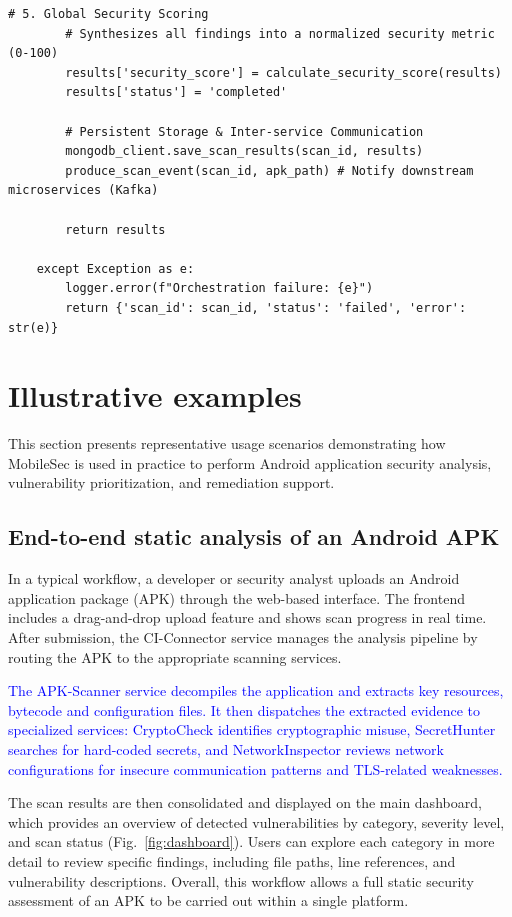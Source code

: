 \documentclass[preprint,12pt, a4paper]{elsarticle}
\begin{document}
\begin{lstlisting}[style=pythonStyle]
        # 5. Global Security Scoring
        # Synthesizes all findings into a normalized security metric (0-100)
        results['security_score'] = calculate_security_score(results)
        results['status'] = 'completed'

        # Persistent Storage & Inter-service Communication
        mongodb_client.save_scan_results(scan_id, results)
        produce_scan_event(scan_id, apk_path) # Notify downstream microservices (Kafka)

        return results

    except Exception as e:
        logger.error(f"Orchestration failure: {e}")
        return {'scan_id': scan_id, 'status': 'failed', 'error': str(e)}
\end{lstlisting}

\section{Illustrative examples}

This section presents representative usage scenarios demonstrating how MobileSec is used in practice to perform Android application security analysis, vulnerability prioritization, and remediation support.

\subsection{End-to-end static analysis of an Android APK}

In a typical workflow, a developer or security analyst uploads an Android application package (APK) through the web-based interface. The frontend includes a drag-and-drop upload feature and shows scan progress in real time. After submission, the CI-Connector service manages the analysis pipeline by routing the APK to the appropriate scanning services.

\textcolor{blue}{The APK-Scanner service decompiles the application and extracts key resources, bytecode and configuration files. It then dispatches the extracted evidence to specialized services: CryptoCheck identifies cryptographic misuse, SecretHunter searches for hard-coded secrets, and NetworkInspector reviews network configurations for insecure communication patterns and TLS-related weaknesses.}

The scan results are then consolidated and displayed on the main dashboard, which provides an overview of detected vulnerabilities by category, severity level, and scan status (Fig.~\ref{fig:dashboard}). Users can explore each category in more detail to review specific findings, including file paths, line references, and vulnerability descriptions. Overall, this workflow allows a full static security assessment of an APK to be carried out within a single platform.
\end{document}
